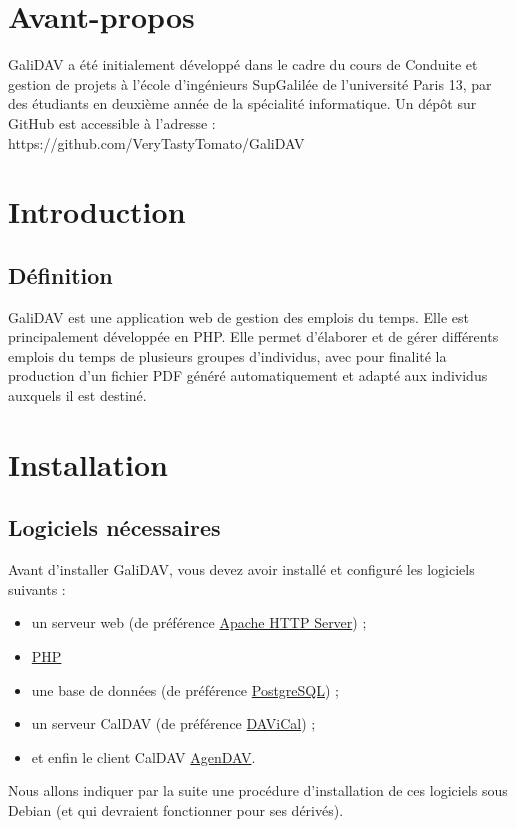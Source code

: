 \documentclass[a4paper, 11pt]{report}
\begin{document}
	\chapter*{Avant-propos}
		GaliDAV a été initialement développé dans le cadre du cours de Conduite et gestion de projets à l’école d’ingénieurs SupGalilée de l’université Paris 13, par des étudiants en deuxième année de la spécialité informatique. Un dépôt sur GitHub est accessible à l’adresse : https://github.com/VeryTastyTomato/GaliDAV
	\chapter*{Introduction}
		\section*{Définition}
			GaliDAV est une application web de gestion des emplois du temps. Elle est principalement développée en PHP. Elle permet d’élaborer et de gérer différents emplois du temps de plusieurs groupes d’individus, avec pour finalité la production d’un fichier PDF généré automatiquement et adapté aux individus auxquels il est destiné.
	\chapter{Installation}
		\section{Logiciels nécessaires}
			Avant d’installer GaliDAV, vous devez avoir installé et configuré les logiciels suivants :
			\begin{itemize}
				\item un serveur web (de préférence \href{http://httpd.apache.org/}{Apache HTTP Server}) ;
				\item \href{http://php.net/}{PHP}
				\item une base de données (de préférence \href{http://www.postgresql.org/}{PostgreSQL}) ;
				\item un serveur CalDAV (de préférence \href{http://www.davical.org/}{DAViCal}) ;
				\item et enfin le client CalDAV \href{http://agendav.org/}{AgenDAV}.
			\end{itemize}

			Nous allons indiquer par la suite une procédure d’installation de ces logiciels sous Debian (et qui devraient fonctionner pour ses dérivés).
\end{document}

